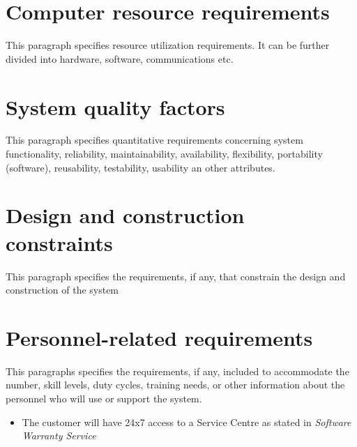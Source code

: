 \section{Computer resource requirements}
This paragraph specifies resource utilization requirements. It can be further divided into hardware, software, communications etc.



\section{System quality factors}
This paragraph specifies quantitative requirements concerning system functionality, reliability, maintainability, availability, flexibility, portability (software), reusability, testability, usability an other attributes.



\section{Design and construction constraints}
This paragraph specifies the requirements, if any, that constrain the design and construction of the system



\section{Personnel-related requirements}
This paragraphs specifies the requirements, if any, included to accommodate the number, skill levels, duty cycles, training needs, or other information about the personnel who will use or support the system.

\begin{itemize}
	\item The customer will have 24x7 access to a Service Centre as stated in \emph{Software Warranty Service}
\end{itemize}


